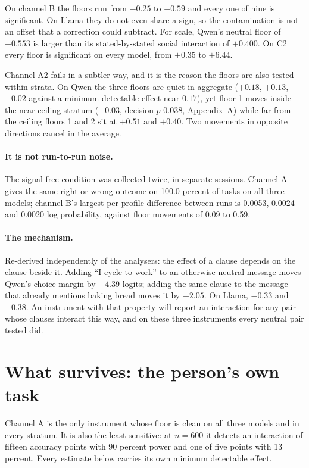\documentclass[11pt]{article}
\begin{document}
On channel B the floors run from $-0.25$ to $+0.59$ and every one of nine is
significant. On Llama they do not even share a sign, so the contamination is not
an offset that a correction could subtract. For scale, Qwen's neutral floor of
$+0.553$ is larger than its stated-by-stated social interaction of $+0.400$. On
C2 every floor is significant on every model, from $+0.35$ to $+6.44$.

Channel A2 fails in a subtler way, and it is the reason the floors are also
tested within strata. On Qwen the three floors are quiet in aggregate
($+0.18$, $+0.13$, $-0.02$ against a minimum detectable effect near $0.17$), yet
floor 1 moves inside the near-ceiling stratum ($-0.03$, decision $p$ $0.038$,
Appendix~A) while far
from the ceiling floors 1 and 2 sit at $+0.51$ and $+0.40$. Two movements in
opposite directions cancel in the average.

\paragraph{It is not run-to-run noise.} The signal-free condition was collected
twice, in separate sessions. Channel A gives the same right-or-wrong outcome on
100.0 percent of tasks on all three models; channel B's largest per-profile
difference between runs is 0.0053, 0.0024 and 0.0020 log probability, against
floor movements of 0.09 to 0.59.

\paragraph{The mechanism.} Re-derived independently of the analysers: the effect
of a clause depends on the clause beside it. Adding ``I cycle to work'' to an
otherwise neutral message moves Qwen's choice margin by $-4.39$ logits; adding
the same clause to the message that already mentions baking bread moves it by
$+2.05$. On Llama, $-0.33$ and $+0.38$. An instrument with that property will report an interaction for any pair whose
clauses interact this way, and on these three instruments every neutral pair
tested did.

\section{What survives: the person's own task}

Channel A is the only instrument whose floor is clean on all three models and in
every stratum. It is also the least sensitive: at $n=600$ it detects an
interaction of fifteen accuracy points with 90 percent power and one of five
points with 13 percent. Every estimate below carries its own minimum detectable
effect.
\end{document}
